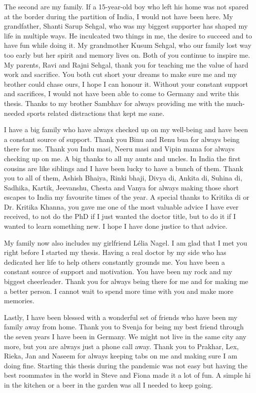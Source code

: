 The second are my family. If a 15-year-old boy who left his home was not spared at the border during the partition of India, I would not have been here. My grandfather, Shanti Sarup Sehgal, who was my biggest supporter has shaped my life in multiple ways. He inculcated two things in me, the desire to succeed and to have fun while doing it. My grandmother Kusum Sehgal, who our family lost way too early but her spirit and memory lives on. Both of you continue to inspire me. My parents, Ravi and Rajni Sehgal, thank you for teaching me the value of hard work and sacrifice. You both cut short your dreams to make sure me and my brother could chase ours, I hope I can honour it. Without your constant support and sacrifices, I would not have been able to come to Germany and write this thesis. Thanks to my brother Sambhav for always providing me with the much-needed sports related distractions that kept me sane. 

I have a big family who have always checked up on my well-being and have been a constant source of support. Thank you Binu and Renu bua for always being there for me. Thank you Indu masi, Neeru masi and Vipin mama for always checking up on me. A big thanks to all my aunts and uncles.
In India the first cousins are like siblings and I have been lucky to have a bunch of them. Thank you to all of them, Ashish Bhaiya, Rinki bhaji, Divya di, Ankita di, Suhina di, Sadhika, Kartik, Jeevanshu, Chesta and Vanya for always making those short escapes to India my favourite times of the year. A special thanks to Kritika di or Dr. Kritika Khanna, you gave me one of the most valuable advice I have ever received, to not do the PhD if I just wanted the doctor title, but to do it if I wanted to learn something new. I hope I have done justice to that advice.     

My family now also includes my girlfriend Lélia Nagel. I am glad that I met you right before I started my thesis. Having a real doctor by my side who has dedicated her life to help others constantly grounds me. You have been a constant source of support and motivation. You have been my rock and my biggest cheerleader. Thank you for always being there for me and for making me a better person. I cannot wait to spend more time with you and make more memories.

Lastly, I have been blessed with a wonderful set of friends who have been my family away from home. Thank you to Svenja for being my best friend through the seven years I have been in Germany. We might not live in the same city any more, but you are always just a phone call away. Thank you to Prakhar, Lex, Rieka, Jan and Naseem for always keeping tabs on me and making sure I am doing fine. Starting this thesis during the pandemic was not easy but having the best roommates in the world in Steve and Fiona made it a lot of fun. A simple hi in the kitchen or a beer in the garden was all I needed to keep going. 

